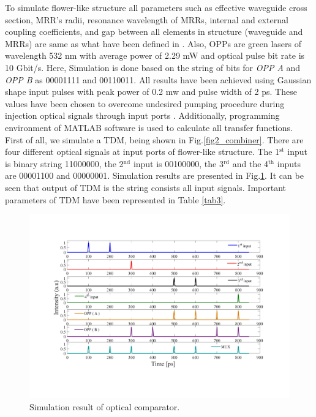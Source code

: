 \documentclass{osa-article}
\begin{document}
To simulate flower-like structure all parameters such as effective waveguide cross section, MRR’s radii, resonance wavelength of MRRs, internal and external coupling coefficients, and gap between all elements in structure (waveguide and MRRs)  are same as what have been defined in \cite{lalehsimulation}. Also, OPPs are green lasers of wavelength 532 nm with average power of 2.29 mW and optical pulse bit rate is 10 Gbit/s. Here, Simulation is done based on the string of bits for \textit{OPP A} and \textit{OPP B} as 00001111 and 00110011. All results have been achieved using Gaussian shape input pulses with peak power of 0.2 mw and pulse width of 2 ps. These values have been chosen to overcome undesired pumping procedure during injection optical signals through input ports \cite{lalehsimulation}. Additionally, programming environment of MATLAB software is used to calculate all transfer functions.
First of all, we simulate a TDM, being shown in Fig.\ref{fig2_combiner}. There are four different optical signals at input ports of flower-like structure. The 1$^{\text{st}}$ input is binary string 11000000, the 2$^{\text{nd}}$ input is 00100000, the 3$^{\text{rd}}$ and the 4$^{\text{th}}$ inputs are 00001100 and 00000001. Simulation results are presented in Fig.\ref{fig3_muxfi}. It can be seen that output of TDM is the string consists all input signals. Important parameters of TDM have been represented in Table \ref{tab3}.
\begin{figure}[tb]
\centering
\includegraphics[width=5 in]{figs/fig3_muxfi.pdf}
	\caption{Simulation result of optical comparator.}
	\label{fig3_muxfi}
\end{figure}
\end{document}
